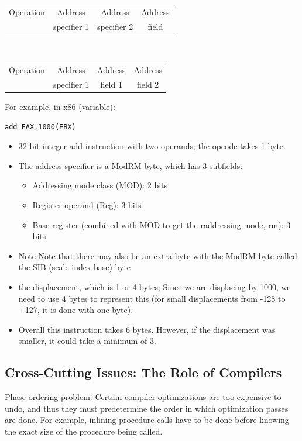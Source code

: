 \documentclass[11pt, a4paper]{article}
\theoremstyle{definition}
\theoremstyle{remark}
\begin{document}
\begin{tabular}{|c|c|c|c|}
\hline
Operation & Address & Address & Address \\ 
& specifier 1 & specifier 2 & field \\
\hline
\end{tabular} \\
\begin{tabular}{|c|c|c|c|}
\hline
Operation & Address & Address & Address \\ 
& specifier 1 & field 1 & field 2\\
\hline
\end{tabular}
For example, in x86 (variable):
\begin{verbatim}
add EAX,1000(EBX)
\end{verbatim}
\begin{itemize}
  \item 32-bit integer add instruction with two operands; the opcode takes 1 byte.
  \item The address specifier is a ModRM byte, which has 3 subfields:
  \begin{itemize}
    \item Addressing mode class (MOD): 2 bits 
    \item Register operand (Reg): 3 bits 
    \item Base register (combined with MOD to get the raddressing mode, rm): 3 bits
  \end{itemize}
  \item Note Note that there may also be an extra byte with the ModRM byte called the SIB (scale-index-base) byte
  \item the displacement, which is 1 or 4 bytes; Since we are displacing by 1000, we need to use 4 bytes to represent this (for small displacements from -128 to +127, it is done with one byte).
  \item Overall this instruction takes 6 bytes. However, if the displacement was smaller, it could take a minimum of 3.
\end{itemize}
\subsection{Cross-Cutting Issues: The Role of Compilers}
Phase-ordering problem: Certain compiler optimizations are too expensive to undo, and thus they must predetermine the order in which optimization passes are done. For example, inlining procedure calls have to be done before knowing the exact size of the procedure being called.
\end{document}
